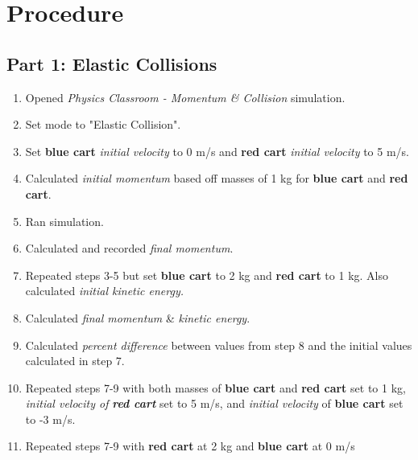 
\section{Procedure}
\vspace{-0.5cm}
\singlespacing



\subsection{Part 1: Elastic Collisions}

\begin{enumerate}
		\item Opened \emph{Physics Classroom - Momentum \& Collision }simulation.

		\item Set mode to "Elastic Collision".

		\item Set \textbf{blue cart }\emph{initial velocity }to 0 m/s and \textbf{red
			cart }\emph{initial velocity }to 5 m/s.

		\item Calculated \emph{initial momentum }based off masses of 1 kg for \textbf{blue
			cart }and \textbf{red cart}.

		\item Ran simulation.

		\item Calculated and recorded \emph{final momentum}.

		\item Repeated steps 3-5 but set \textbf{blue cart }to 2 kg and \textbf{red
			cart }to 1 kg. Also calculated \emph{initial kinetic energy.}

		\item Calculated \emph{final momentum }\& \emph{kinetic energy}.

		\item Calculated \emph{percent difference }between values from step 8 and the
			initial values calculated in step 7.

		\item Repeated steps 7-9 with both masses of \textbf{blue cart }and \textbf{red
			cart }set to 1 kg, \emph{initial velocity of }\textbf{\emph{red cart }}set
			to 5 m/s, and \emph{initial velocity }of \textbf{blue cart }set to -3 m/s.

		\item Repeated steps 7-9 with \textbf{red cart }at 2 kg and \textbf{blue
			cart }at 0 m/s
	\end{enumerate}

